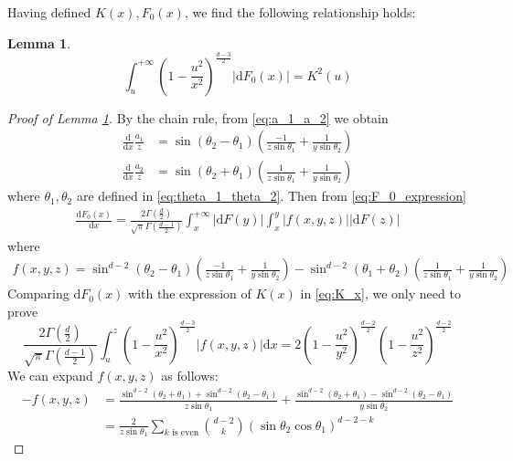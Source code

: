 \documentclass[conference,a4paper]{IEEEtran}
\def\d{\mathrm{d}}
\newtheorem{lemma}{Lemma}
\begin{document}
Having defined $K(x), F_0(x)$, we find the following relationship holds:
\begin{lemma}\label{lem:K_F_relationship}
\begin{equation}\label{eq:F_0_integration}
     \int_u^{+\infty}
     (1-\frac{u^2}{x^2})^{\frac{d-3}{2}} |\d F_0(x)| = K^2(u)
\end{equation}
\end{lemma}
\begin{proof}[Proof of Lemma \ref{lem:K_F_relationship}]
     By the chain rule, from \eqref{eq:a_1_a_2} we obtain
\begin{align*}
    \frac{\d}{\d x}\frac{a_1}{z} &
    = \sin(\theta_2 - \theta_1)
    \left(\frac{-1}{z\sin\theta_1}
    +\frac{1}{y\sin \theta_2}\right)\\
    \frac{\d}{\d x}\frac{a_2}{z} &
    = \sin(\theta_2 + \theta_1)
    \left(\frac{1}{z\sin\theta_1}
    +\frac{1}{y\sin \theta_2}\right)
\end{align*}
where $\theta_1, \theta_2$ are defined in \eqref{eq:theta_1_theta_2}.
Then from \eqref{eq:F_0_expression}
\begin{align*}
    \frac{\d F_0(x)}{\d x}  =\frac{2\Gamma(\frac{d}{2})}
    {\sqrt{\pi}\Gamma(\frac{d-1}{2})}
    \int_x^{+\infty} |\d F(y)| \int_x^y |f(x,y,z)| |\d F(z)| 
\end{align*}
where
\begin{align*}
    f(x,y,z) = \sin^{d-2} (\theta_2 - \theta_1)
    \left(\frac{-1}{z\sin\theta_1}
    +\frac{1}{y\sin \theta_2}\right)
    - \sin^{d-2}(\theta_1 + \theta_2)
    \left(\frac{1}{z\sin\theta_1}
    +\frac{1}{y\sin \theta_2}\right)
\end{align*}
Comparing $\d F_0(x)$
with the expression of $K(x)$ in
\eqref{eq:K_x},
we only need to prove
\begin{equation}\label{eq:ref_prove_integration}    
    \frac{2\Gamma(\frac{d}{2})}
    {\sqrt{\pi}\Gamma(\frac{d-1}{2})}
    \int_u^z (1-\frac{u^2}{x^2})^{\frac{d-3}{2}}
    |f(x,y,z)|\d x =
    2(1-\frac{u^2}{y^2})^{\frac{d-2}{2}}
    (1-\frac{u^2}{z^2})^{\frac{d-2}{2}}
\end{equation}
We can expand $f(x,y,z)$ as follows:
\begin{align*}
-f(x,y,z)&=\frac{\sin^{d-2}(\theta_2+\theta_1)
+ \sin^{d-2}(\theta_2 - \theta_1)}{z\sin\theta_1}
+\frac{\sin^{d-2}(\theta_2+\theta_1)
- \sin^{d-2}(\theta_2 - \theta_1)}{y\sin\theta_2} \\
&=\frac{2}{z\sin\theta_1}\sum_{k \textrm{ is even}}
\binom{d-2}{k} (\sin\theta_2\cos\theta_1)^{d-2-k}

\end{align*}
\end{proof}
\end{document}
